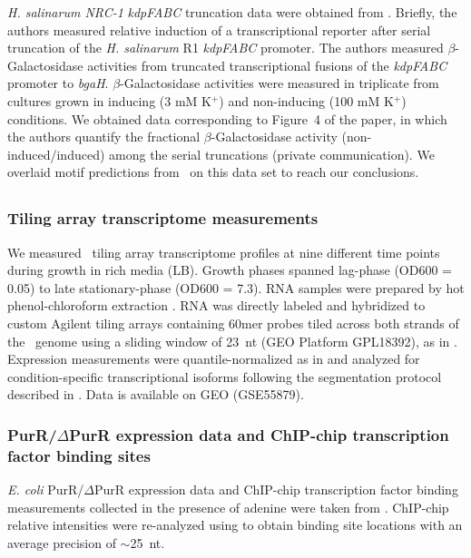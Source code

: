 {\it H. salinarum NRC-1} \textit{kdpFABC} truncation data were
obtained from \cite{Kixmueller2011}. Briefly, the authors measured
relative induction of a transcriptional reporter after serial
truncation of the \textit{H. salinarum} R1 \textit{kdpFABC}
promoter. The authors measured $\beta$-Galactosidase activities from
truncated transcriptional fusions of the \textit{kdpFABC} promoter
to \textit{bgaH}. $\beta$-Galactosidase activities were measured in
triplicate from cultures grown in inducing (3 mM K$^{+}$) and
non-inducing (100 mM K$^{+}$) conditions. We obtained data
corresponding to Figure~4 of the paper, in which the authors quantify
the fractional $\beta$-Galactosidase activity (non-induced/induced)
among the serial truncations (private communication). We overlaid
motif predictions from \egrine~on this data set to reach our
conclusions.

\subsection{\eco}\label{ecodata}

\subsubsection{Tiling array transcriptome measurements}
\label{section:ecoarray}

We measured \eco\ tiling array transcriptome profiles at nine
different time points during growth in rich media (LB). Growth phases
spanned lag-phase (OD600 = 0.05) to late stationary-phase (OD600 =
7.3). RNA samples were prepared by hot phenol-chloroform
extraction \cite{Khodursky2003}. RNA was directly labeled and
hybridized to custom Agilent tiling arrays containing 60mer probes
tiled across both strands of the \eco\ genome using a sliding window
of 23~nt (GEO Platform GPL18392), as in \cite{Koide2009}. Expression
measurements were quantile-normalized as in \cite{Yoon2011} and
analyzed for condition-specific transcriptional isoforms following the
segmentation protocol described in \cite{Koide2009}. Data is available
on GEO (GSE55879).

\subsubsection{PurR/$\Delta$PurR expression data and ChIP-chip transcription factor binding sites} 

{\it E. coli} PurR/$\Delta$PurR expression data and ChIP-chip
transcription factor binding measurements collected in the presence of
adenine were taken from \cite{Cho2011a}. ChIP-chip relative
intensities were re-analyzed using
{} \cite{Reiss2008} to obtain binding site locations
with an average precision of $\sim$25~nt.

